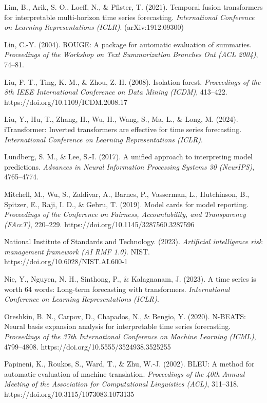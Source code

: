 Lim, B., Arik, S. O., Loeff, N., \& Pfister, T. (2021). Temporal fusion
transformers for interpretable multi-horizon time series forecasting.
\emph{International Conference on Learning Representations (ICLR)}.
(arXiv:1912.09300)

Lin, C.-Y. (2004). ROUGE: A package for automatic evaluation of
summaries. \emph{Proceedings of the Workshop on Text Summarization
Branches Out (ACL 2004)}, 74--81.

Liu, F. T., Ting, K. M., \& Zhou, Z.-H. (2008). Isolation forest.
\emph{Proceedings of the 8th IEEE International Conference on Data
Mining (ICDM)}, 413--422. https://doi.org/10.1109/ICDM.2008.17

Liu, Y., Hu, T., Zhang, H., Wu, H., Wang, S., Ma, L., \& Long, M.
(2024). iTransformer: Inverted transformers are effective for time
series forecasting. \emph{International Conference on Learning
Representations (ICLR)}.

Lundberg, S. M., \& Lee, S.-I. (2017). A unified approach to
interpreting model predictions. \emph{Advances in Neural Information
Processing Systems 30 (NeurIPS)}, 4765--4774.

Mitchell, M., Wu, S., Zaldivar, A., Barnes, P., Vasserman, L.,
Hutchinson, B., Spitzer, E., Raji, I. D., \& Gebru, T. (2019). Model
cards for model reporting. \emph{Proceedings of the Conference on
Fairness, Accountability, and Transparency (FAccT)}, 220--229.
https://doi.org/10.1145/3287560.3287596

National Institute of Standards and Technology. (2023). \emph{Artificial
intelligence risk management framework (AI RMF 1.0)}. NIST.
https://doi.org/10.6028/NIST.AI.600-1

Nie, Y., Nguyen, N. H., Sinthong, P., \& Kalagnanam, J. (2023). A time
series is worth 64 words: Long-term forecasting with transformers.
\emph{International Conference on Learning Representations (ICLR)}.

Oreshkin, B. N., Carpov, D., Chapados, N., \& Bengio, Y. (2020).
N-BEATS: Neural basis expansion analysis for interpretable time series
forecasting. \emph{Proceedings of the 37th International Conference on
Machine Learning (ICML)}, 4799--4808.
https://doi.org/10.5555/3524938.3525255

Papineni, K., Roukos, S., Ward, T., \& Zhu, W.-J. (2002). BLEU: A method
for automatic evaluation of machine translation. \emph{Proceedings of
the 40th Annual Meeting of the Association for Computational Linguistics
(ACL)}, 311--318. https://doi.org/10.3115/1073083.1073135

